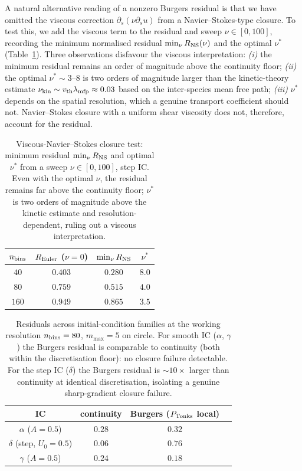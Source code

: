 \documentclass[aps,pre,twocolumn,superscriptaddress,longbibliography,floatfix]{revtex4-2}
\begin{document}
A natural alternative reading of a nonzero Burgers residual is
that we have omitted the viscous correction
$\partial_s(\nu\partial_s u)$ from a Navier--Stokes-type
closure. To test this, we add the viscous term to the residual
and sweep $\nu\in[0,100]$, recording the minimum normalised
residual $\min_\nu R_{\rm NS}(\nu)$ and the optimal $\nu^*$
(Table~\ref{tab:nu}). Three observations disfavour the viscous
interpretation:
\emph{(i)} the minimum residual remains an order of magnitude
above the continuity floor;
\emph{(ii)} the optimal $\nu^*\sim 3$--$8$ is two orders of
magnitude larger than the kinetic-theory estimate
$\nu_{\rm kin}\sim v_{\rm th}\lambda_{\rm mfp}\approx 0.03$
based on the inter-species mean free path;
\emph{(iii)} $\nu^*$ depends on the spatial resolution, which a
genuine transport coefficient should not. Navier--Stokes
closure with a uniform shear viscosity does not, therefore,
account for the residual.

\begin{table}[t]
\centering
\caption{Viscous-Navier--Stokes closure test: minimum residual
$\min_\nu R_{\rm NS}$ and optimal $\nu^*$ from a sweep
$\nu\in[0,100]$, step IC. Even with the optimal $\nu$, the
residual remains far above the continuity floor; $\nu^*$ is
two orders of magnitude above the kinetic estimate and
resolution-dependent, ruling out a viscous interpretation.}
\label{tab:nu}
\begin{tabular}{cccc}
\hline\hline
$n_{\rm bins}$ & $R_{\rm Euler}$ ($\nu=0$)
                  & $\min_\nu R_{\rm NS}$ & $\nu^*$\\
\hline
$40$  & $0.403$ & $0.280$ & $8.0$\\
$80$  & $0.759$ & $0.515$ & $4.0$\\
$160$ & $0.949$ & $0.865$ & $3.5$\\
\hline\hline
\end{tabular}
\end{table}

\begin{table}[t]
\centering
\caption{Residuals across initial-condition families at the
working resolution $n_{\rm bins}=80$, $m_{\max}=5$ on circle.
For smooth IC ($\alpha$, $\gamma$) the Burgers residual is
comparable to continuity (both within the discretisation
floor): no closure failure detectable. For the step IC ($\delta$)
the Burgers residual is $\sim 10\times$ larger than continuity
at identical discretisation, isolating a genuine
sharp-gradient closure failure.}
\label{tab:moments}
\begin{tabular}{cccc}
\hline\hline
IC & continuity & Burgers ($P_{\rm Tonks}$ local) \\
\hline
$\alpha$ ($A=0.5$)        & $0.28$ & $0.32$ \\
$\delta$ (step, $U_0=0.5$)& $0.06$ & $\mathbf{0.76}$ \\
$\gamma$ ($A=0.5$)        & $0.24$ & $0.18$ \\
\hline\hline
\end{tabular}
\end{table}
\end{document}
